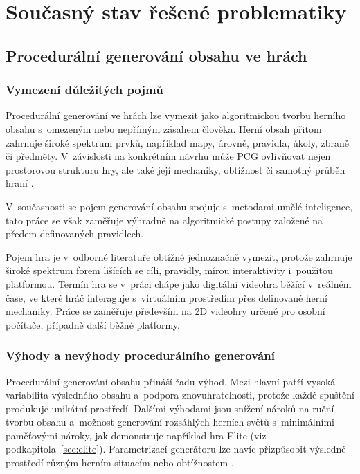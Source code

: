 \documentclass[
   program=itk,
   biblatex,
   figures=true,
   tables=true,
   glossaries,
   index
]{kidiplom}
\begin{document}
\section{Současný stav řešené problematiky}

\subsection{Procedurální generování obsahu ve hrách}

\subsubsection{Vymezení důležitých pojmů}
Procedurální generování ve hrách lze vymezit jako algoritmickou tvorbu herního obsahu s~omezeným nebo nepřímým zásahem člověka. Herní obsah přitom zahrnuje široké spektrum prvků, například mapy, úrovně, pravidla, úkoly, zbraně či předměty. V~závislosti na konkrétním návrhu může PCG ovlivňovat nejen prostorovou strukturu hry, ale také její mechaniky, obtížnost či samotný průběh hraní \cite{Shaker2016}.

V~současnosti se pojem generování obsahu spojuje s~metodami umělé inteligence, tato práce se však zaměřuje výhradně na algoritmické postupy založené na předem definovaných pravidlech.

Pojem hra je v~odborné literatuře obtížné jednoznačně vymezit, protože zahrnuje široké spektrum forem lišících se cíli, pravidly, mírou interaktivity i~použitou platformou. Termín hra se v~práci chápe jako digitální videohra běžící v~reálném čase, ve které hráč interaguje s~virtuálním prostředím přes definované herní mechaniky. Práce se zaměřuje především na 2D videohry určené pro osobní počítače, případně další běžné platformy.


\subsubsection{Výhody a nevýhody procedurálního generování}
Procedurální generování obsahu přináší řadu výhod. Mezi hlavní patří vysoká variabilita výsledného obsahu a~podpora znovuhratelnosti, protože každé spuštění produkuje unikátní prostředí. Dalšími výhodami jsou snížení nároků na ruční tvorbu obsahu a~možnost generování rozsáhlých herních světů s~minimálními paměťovými nároky, jak demonstruje například hra Elite (viz podkapitola~\ref{sec:elite}). Parametrizací generátoru lze navíc přizpůsobit výsledné prostředí různým herním situacím nebo obtížnostem \cite{Shaker2016,Linden2014}.
\end{document}
